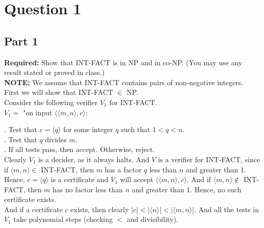 \documentclass[12pt]{article}
\begin{document}

\setlength\parindent{0pt}

\section*{Question 1}

\subsection*{Part 1}

\textbf{Required:} Show that INT-FACT is in NP and in co-NP. (You may use any result stated or proved in class.) \\

\textbf{NOTE:} We assume that INT-FACT contains pairs of non-negative integers. \\

First we will show that INT-FACT $\in$ NP. \\

Consider the following verifier $V_1$ for INT-FACT. \\

$V_1 = $ "on input $\langle \langle m, n \rangle, c \rangle$: \\

\setlength\parindent{15pt}

. Test that $c = \langle q \rangle$ for some integer $q$ such that $1 < q < n$. \\

. Test that $q$ divides $m$. \\

. If all tests pass, then accept. Otherwise, reject. \\

\setlength\parindent{0pt}
Clearly $V_1$ is a decider, as it always halts. And $V$ is a verifier for INT-FACT, since if $\langle m, n \rangle \in$ INT-FACT, then $m$ has a factor $q$ less than $n$ and greater than 1. Hence, $c = \langle q \rangle$ is a certificate and $V_1$ will accept $\langle \langle m,n \rangle, c \rangle$. And if $\langle m,n \rangle \not \in$ INT-FACT, then $m$ has no factor less than $n$ and greater than 1. Hence, no such certificate exists. \\

And if a certificate $c$ exists, then clearly $|c| < |\langle n \rangle| < |\langle m, n \rangle|$. And all the tests in $V_1$ take polynomial steps (checking $<$ and divisibility). \\
\end{document}
